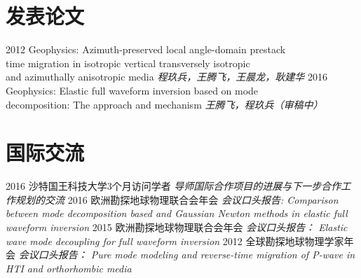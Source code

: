 \documentclass[]{friggeri-cv}
\begin{document}
\section{发表论文}
\begin{entrylist}
  \entry
    {2012}
	{Geophysics: Azimuth-preserved local angle-domain prestack \\
	time migration in isotropic	vertical transversely isotropic\\
	and azimuthally anisotropic media}
	{\emph{程玖兵，王腾飞，王晨龙，耿建华}}
  \entry
    {2016}
	{Geophysics: Elastic full waveform inversion based on mode\\
		decomposition: The approach and	mechanism
	}
	{\emph{王腾飞，程玖兵（审稿中）}}
\end{entrylist}

\section{国际交流}
\begin{entrylist}
  \entry
    {2016}
    {沙特国王科技大学3个月访问学者}
	{\emph{
		导师国际合作项目的进展与下一步合作工作规划的交流
	}}
  \entry
    {2016}
    {欧洲勘探地球物理联合会年会}
	{\emph{会议口头报告: Comparison between mode decomposition based and Gaussian Newton methods in
		elastic full waveform inversion
	}}
  \entry
    {2015}
    {欧洲勘探地球物理联合会年会}
	{\emph{会议口头报告： 
		Elastic wave mode decoupling for full waveform inversion
	}}
  \entry
    {2012}
    {全球勘探地球物理学家年会}
	{\emph{会议口头报告： Pure mode modeling and reverse-time migration of P-wave in
		HTI and orthorhombic media
	}}
\end{entrylist}
\end{document}
